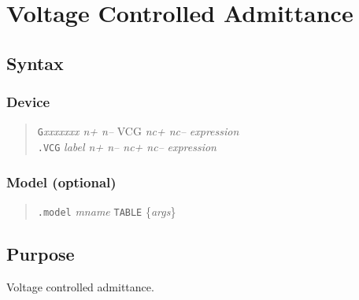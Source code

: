 %
%
%
%
\section{Voltage Controlled Admittance}
\subsection{Syntax}
\subsubsection{Device}
\begin{verse}
{\tt G}{\it xxxxxxx n+ n--} VCG {\it nc+ nc--} {\it expression}\\
{\tt .VCG} {\it label n+ n-- nc+ nc--} {\it expression}
\end{verse}
\subsubsection{Model (optional)}
\begin{verse}
{\tt .model} {\it mname} {\tt TABLE} \{{\it args}\}
\end{verse}
\subsection{Purpose}

Voltage controlled admittance.
